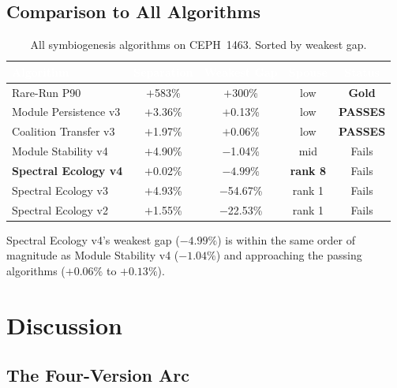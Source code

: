 \documentclass{../yalumba}
\begin{document}
\subsection{Comparison to All Algorithms}

\begin{table}[H]
  \centering
  \tablestyle
  \caption{All symbiogenesis algorithms on CEPH~1463.  Sorted by weakest gap.}
  \label{tab:all}
  \begin{tabular}{lcccc}
    \toprule
    \rowcolor{table-header}
    \textcolor{white}{\textbf{Algorithm}} &
    \textcolor{white}{\textbf{Separation}} &
    \textcolor{white}{\textbf{Weakest Gap}} &
    \textcolor{white}{\textbf{Spouse}} &
    \textcolor{white}{\textbf{Status}} \\
    \midrule
    Rare-Run P90
      & $+$583\% & $+$300\% & low & \textbf{Gold} \\
    Module Persistence v3
      & $+$3.36\% & $+$0.13\% & low & \textbf{PASSES} \\
    Coalition Transfer v3
      & $+$1.97\% & $+$0.06\% & low & \textbf{PASSES} \\
    Module Stability v4
      & $+$4.90\% & $-$1.04\% & mid & Fails \\
    \textbf{Spectral Ecology v4}
      & $+$0.02\% & $\mathbf{-4.99\%}$ & \textbf{rank 8} & Fails \\
    Spectral Ecology v3
      & $+$4.93\% & $-$54.67\% & rank 1 & Fails \\
    Spectral Ecology v2
      & $+$1.55\% & $-$22.53\% & rank 1 & Fails \\
    \bottomrule
  \end{tabular}
\end{table}

Spectral Ecology v4's weakest gap ($-4.99\%$) is within the same order of
magnitude as Module Stability v4 ($-1.04\%$) and approaching the passing
algorithms ($+0.06\%$ to $+0.13\%$).


\section{Discussion}
\label{sec:discussion}

\subsection{The Four-Version Arc}
\end{document}
